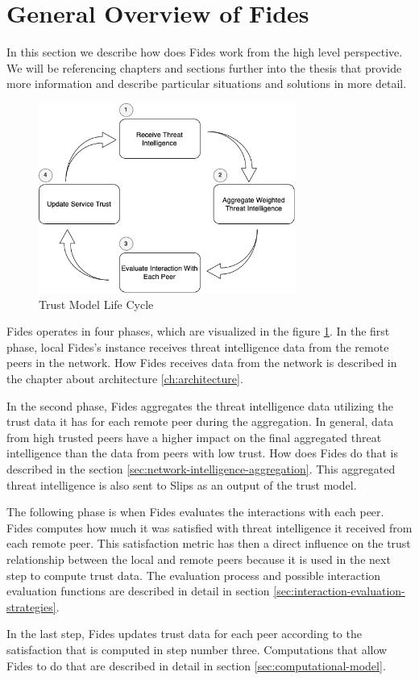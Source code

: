 \section{General Overview of Fides}
\label{sec:general-overview-of-fides}
In this section we describe how does Fides work from the high level perspective. We will be referencing chapters and sections further into the thesis that provide more information and describe particular situations and solutions in more detail.

\begin{figure}[ht!]
    \centering
    \includegraphics[width=0.75\textwidth]{assets/service_trust_diagram.png}
    \caption{Trust Model Life Cycle}
    \label{fig:trust-model-life-cycle}
\end{figure}

Fides operates in four phases, which are visualized in the figure \ref{fig:trust-model-life-cycle}.
In the first phase, local Fides's instance receives threat intelligence data from the remote peers in the network. 
How Fides receives data from the network is described in the chapter about architecture \ref{ch:architecture}.

In the second phase, Fides aggregates the threat intelligence data utilizing the trust data it has for each remote peer during the aggregation.
In general, data from high trusted peers have a higher impact on the final aggregated threat intelligence than the data from peers with low trust.
How does Fides do that is described in the section  \ref{sec:network-intelligence-aggregation}.
This aggregated threat intelligence is also sent to Slips as an output of the trust model.

The following phase is when Fides evaluates the interactions with each peer.
Fides computes how much it was satisfied with threat intelligence it received from each remote peer.
This satisfaction metric has then a direct influence on the trust relationship between the local and remote peers because it is used in the next step to compute trust data. 
The evaluation process and possible interaction evaluation functions are described in detail in section \ref{sec:interaction-evaluation-strategies}.

In the last step, Fides updates trust data for each peer according to the satisfaction that is computed in step number three.
Computations that allow Fides to do that are described in detail in section \ref{sec:computational-model}.

